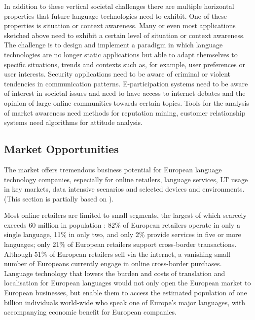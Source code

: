 \documentclass[10pt, plain]{../../metanetpaper}
\begin{document}
\begin{multicols}{2}
In addition to these vertical societal challenges there are multiple horizontal properties that future language technologies need to exhibit. One of these properties is situation or context awareness. Many or even most applications sketched above need to exhibit a certain level of situation or context awareness. The challenge is to design and implement a paradigm in which language technologies are no longer static applications but able to adapt themselves to specific situations, trends and contexts such as, for example, user preferences or user interests. Security applications need to be aware of criminal or violent tendencies in communication patterns. E-participation systems need to be aware of interest in societal issues and need to have access to internet debates and the opinion of large online communities towards certain topics. Tools for the analysis of market awareness need methods for reputation mining, customer relationship systems need algorithms for attitude analysis.

\subsection{Market Opportunities}
\label{sec:market-opportunities}


The market offers tremendous business potential for European language technology companies, especially for online retailers, language services, LT usage in key markets, data intensive scenarios and selected devices and environments. (This section is partially based on \cite{lti2012}).

Most online retailers are limited to small segments, the largest of which scarcely exceeds 60 million in population \cite{iws2012}: 82\% of European retailers operate in only a single language, 11\% in only two, and only 2\% provide services in five or more languages; only 21\% of European retailers support cross-border transactions. Although 51\% of European retailers sell via the internet, a vanishing small number of Europeans currently engage in online cross-border purchases. Language technology that lowers the burden and costs of translation and localisation for European languages would not only open the European market to European businesses, but enable them to access the estimated population of one billion individuals world-wide who speak one of Europe’s major languages, with accompanying economic benefit for European companies.


\end{multicols}
\end{document}
